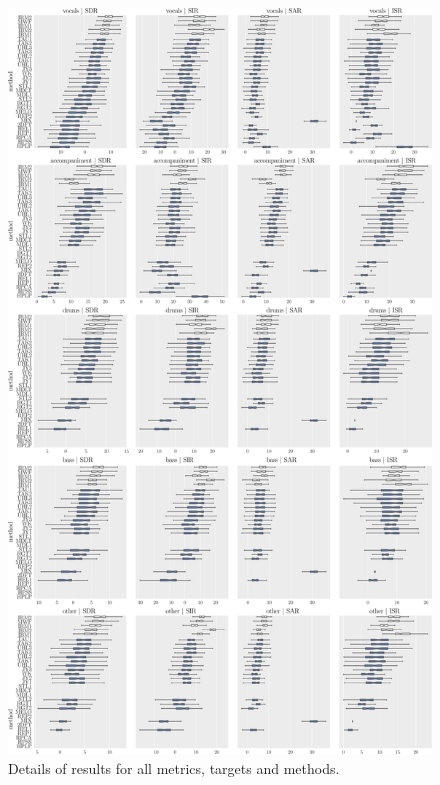 \documentclass{llncs}
\begin{document}
\begin{figure}
  \begin{center}
     \includegraphics[width=\linewidth]{fig/boxplot.pdf}
     \vspace{-1cm}
  \end{center}
  \caption{Details of results for all metrics, targets and methods.}
  \label{fig:boxplots_bsseval}
\end{figure}
\end{document}
